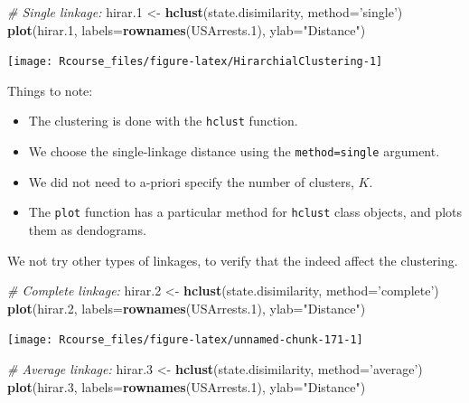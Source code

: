 \documentclass[]{book}
\newenvironment{Shaded}{\begin{snugshade}}{\end{snugshade}}
\newcommand{\KeywordTok}[1]{\textcolor[rgb]{0.13,0.29,0.53}{\textbf{{#1}}}}
\newcommand{\DataTypeTok}[1]{\textcolor[rgb]{0.13,0.29,0.53}{{#1}}}
\newcommand{\FloatTok}[1]{\textcolor[rgb]{0.00,0.00,0.81}{{#1}}}
\newcommand{\StringTok}[1]{\textcolor[rgb]{0.31,0.60,0.02}{{#1}}}
\newcommand{\CommentTok}[1]{\textcolor[rgb]{0.56,0.35,0.01}{\textit{{#1}}}}
\newcommand{\NormalTok}[1]{{#1}}
\providecommand{\tightlist}{%
  \setlength{\itemsep}{0pt}\setlength{\parskip}{0pt}}
\theoremstyle{definition}
\theoremstyle{definition}
\theoremstyle{remark}
\begin{document}
\begin{Shaded}
\begin{Highlighting}[]
\CommentTok{# Single linkage:}
\NormalTok{hirar}\FloatTok{.1} \NormalTok{<-}\StringTok{ }\KeywordTok{hclust}\NormalTok{(state.disimilarity, }\DataTypeTok{method=}\StringTok{'single'}\NormalTok{)}
\KeywordTok{plot}\NormalTok{(hirar}\FloatTok{.1}\NormalTok{, }\DataTypeTok{labels=}\KeywordTok{rownames}\NormalTok{(USArrests}\FloatTok{.1}\NormalTok{), }\DataTypeTok{ylab=}\StringTok{"Distance"}\NormalTok{)}
\end{Highlighting}
\end{Shaded}

\texttt{[image: Rcourse\_files/figure-latex/HirarchialClustering-1]}

Things to note:

\begin{itemize}
\tightlist
\item
  The clustering is done with the \texttt{hclust} function.
\item
  We choose the single-linkage distance using the
  \texttt{method=\textquotesingle{}single\textquotesingle{}} argument.
\item
  We did not need to a-priori specify the number of clusters, \(K\).
\item
  The \texttt{plot} function has a particular method for \texttt{hclust}
  class objects, and plots them as dendograms.
\end{itemize}

We not try other types of linkages, to verify that the indeed affect the
clustering.

\begin{Shaded}
\begin{Highlighting}[]
\CommentTok{# Complete linkage:}
\NormalTok{hirar}\FloatTok{.2} \NormalTok{<-}\StringTok{ }\KeywordTok{hclust}\NormalTok{(state.disimilarity, }\DataTypeTok{method=}\StringTok{'complete'}\NormalTok{)}
\KeywordTok{plot}\NormalTok{(hirar}\FloatTok{.2}\NormalTok{, }\DataTypeTok{labels=}\KeywordTok{rownames}\NormalTok{(USArrests}\FloatTok{.1}\NormalTok{), }\DataTypeTok{ylab=}\StringTok{"Distance"}\NormalTok{)}
\end{Highlighting}
\end{Shaded}

\texttt{[image: Rcourse\_files/figure-latex/unnamed-chunk-171-1]}

\begin{Shaded}
\begin{Highlighting}[]
\CommentTok{# Average linkage:}
\NormalTok{hirar}\FloatTok{.3} \NormalTok{<-}\StringTok{ }\KeywordTok{hclust}\NormalTok{(state.disimilarity, }\DataTypeTok{method=}\StringTok{'average'}\NormalTok{)}
\KeywordTok{plot}\NormalTok{(hirar}\FloatTok{.3}\NormalTok{, }\DataTypeTok{labels=}\KeywordTok{rownames}\NormalTok{(USArrests}\FloatTok{.1}\NormalTok{), }\DataTypeTok{ylab=}\StringTok{"Distance"}\NormalTok{)}
\end{Highlighting}
\end{Shaded}
\end{document}
